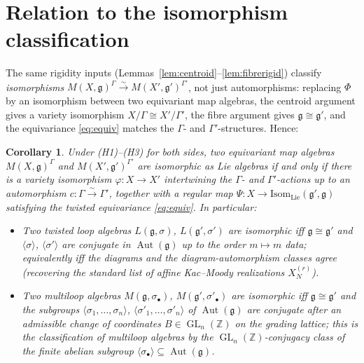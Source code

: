 \documentclass{amsart}
\newtheorem{corollary}{Corollary}
\theoremstyle{definition}
\DeclareMathOperator{\Aut}{Aut}
\DeclareMathOperator{\GL}{GL}
\newcommand{\g}{\mathfrak{g}}
\newcommand{\Z}{\mathbb{Z}}
\newcommand{\M}{M}
\begin{document}
\section{Relation to the isomorphism classification}\label{sec:iso}

The same rigidity inputs (Lemmas~\ref{lem:centroid}--\ref{lem:fibrerigid})
classify \emph{isomorphisms} $\M(X,\g)^\Gamma\xrightarrow{\sim}
\M(X',\g')^{\Gamma'}$, not just automorphisms: replacing $\Phi$ by an
isomorphism between two equivariant map algebras, the centroid argument
gives a variety isomorphism $X/\Gamma\cong X'/\Gamma'$, the fibre argument
gives $\g\cong\g'$, and the equivariance \eqref{eq:equiv} matches the
$\Gamma$- and $\Gamma'$-structures.  Hence:

\begin{corollary}\label{cor:iso}
Under \textnormal{(H1)--(H3)} for both sides, two equivariant map algebras
$\M(X,\g)^\Gamma$ and $\M(X',\g')^{\Gamma'}$ are isomorphic as Lie algebras
if and only if there is a variety isomorphism $\varphi\colon X\to X'$
intertwining the $\Gamma$- and $\Gamma'$-actions up to an automorphism
$c\colon\Gamma\xrightarrow{\sim}\Gamma'$, together with a regular map
$\Psi\colon X\to\mathrm{Isom}_{\mathrm{Lie}}(\g',\g)$ satisfying the
twisted equivariance \eqref{eq:equiv}.  In particular:
\begin{itemize}
\item Two twisted loop algebras $L(\g,\sigma)$, $L(\g',\sigma')$ are
isomorphic iff $\g\cong\g'$ and $\langle\sigma\rangle$,
$\langle\sigma'\rangle$ are conjugate in $\Aut(\g)$ up to the order
$m\mapsto m$ data; equivalently iff the diagrams and the diagram-automorphism
classes agree (recovering the standard list of affine Kac--Moody
realizations $X_N^{(r)}$).
\item Two multiloop algebras $M(\g,\sigma_\bullet)$,
$M(\g',\sigma'_\bullet)$ are isomorphic iff $\g\cong\g'$ and the subgroups
$\langle\sigma_1,\dots,\sigma_n\rangle$,
$\langle\sigma'_1,\dots,\sigma'_n\rangle$ of $\Aut(\g)$ are conjugate
\emph{after} an admissible change of coordinates $B\in\GL_n(\Z)$ on the
grading lattice; this is the classification of multiloop algebras by the
$\GL_n(\Z)$-conjugacy class of the finite abelian subgroup
$\langle\sigma_\bullet\rangle\subseteq\Aut(\g)$.
\end{itemize}
\end{corollary}
\end{document}

